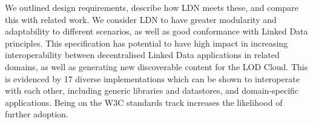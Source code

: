 \documentclass[a4paper]{llncs}
\begin{document}
\par We outlined design requirements, describe how LDN meets these, and compare this with related work. We consider LDN to have greater modularity and adaptability to different scenarios, as well as good conformance with Linked Data principles. This specification has potential to have high impact in increasing interoperability between decentralised Linked Data applications in related domains, as well as generating new discoverable content for the LOD Cloud. This is evidenced by 17 diverse implementations which can be shown to interoperate with each other, including generic libraries and datastores, and domain-specific applications. Being on the W3C standards track increases the likelihood of further adoption.
\end{document}
